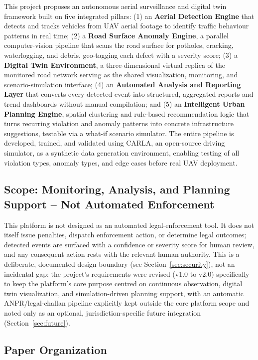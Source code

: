 \documentclass[conference]{IEEEtran}
\begin{document}
This project proposes an autonomous aerial surveillance and digital twin framework built on five integrated pillars: (1) an \textbf{Aerial Detection Engine} that detects and tracks vehicles from UAV aerial footage to identify traffic behaviour patterns in real time; (2) a \textbf{Road Surface Anomaly Engine}, a parallel computer-vision pipeline that scans the road surface for potholes, cracking, waterlogging, and debris, geo-tagging each defect with a severity score; (3) a \textbf{Digital Twin Environment}, a three-dimensional virtual replica of the monitored road network serving as the shared visualization, monitoring, and scenario-simulation interface; (4) an \textbf{Automated Analysis and Reporting Layer} that converts every detected event into structured, aggregated reports and trend dashboards without manual compilation; and (5) an \textbf{Intelligent Urban Planning Engine}, spatial clustering and rule-based recommendation logic that turns recurring violation and anomaly patterns into concrete infrastructure suggestions, testable via a what-if scenario simulator. The entire pipeline is developed, trained, and validated using CARLA, an open-source driving simulator, as a synthetic data generation environment, enabling testing of all violation types, anomaly types, and edge cases before real UAV deployment.

\subsection{Scope: Monitoring, Analysis, and Planning Support -- Not Automated Enforcement}

This platform is not designed as an automated legal-enforcement tool. It does not itself issue penalties, dispatch enforcement action, or determine legal outcomes; detected events are surfaced with a confidence or severity score for human review, and any consequent action rests with the relevant human authority. This is a deliberate, documented design boundary (see Section~\ref{sec:security}), not an incidental gap: the project's requirements were revised (v1.0 to v2.0) specifically to keep the platform's core purpose centred on continuous observation, digital twin visualization, and simulation-driven planning support, with an automatic ANPR/legal-challan pipeline explicitly kept outside the core platform scope and noted only as an optional, jurisdiction-specific future integration (Section~\ref{sec:future}).

\subsection{Paper Organization}
\end{document}
